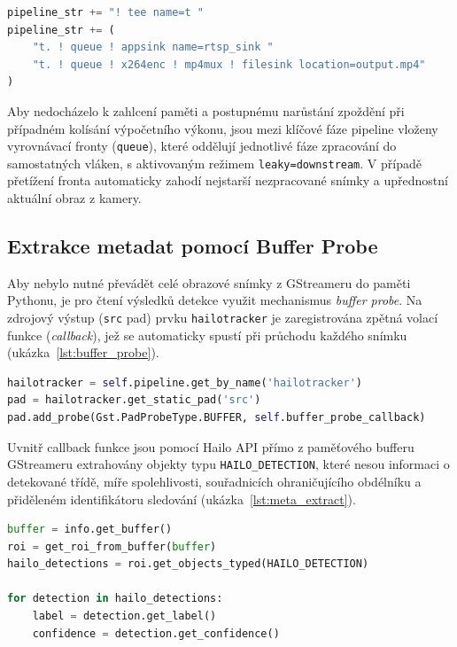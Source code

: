 \documentclass[male,czech,api_bc]{kitheses}
\begin{document}
\begin{lstlisting}[language=Python, caption={Větvení výstupu pipeline pomocí prvku tee.}, label={lst:gst_tee}]
pipeline_str += "! tee name=t "
pipeline_str += (
    "t. ! queue ! appsink name=rtsp_sink "
    "t. ! queue ! x264enc ! mp4mux ! filesink location=output.mp4"
)
\end{lstlisting}

Aby nedocházelo k zahlcení paměti a postupnému narůstání zpoždění při případném kolísání výpočetního výkonu, jsou mezi klíčové fáze pipeline vloženy vyrovnávací fronty (\texttt{queue}), které oddělují jednotlivé fáze zpracování do samostatných vláken, s aktivovaným režimem \texttt{leaky=downstream}. V případě přetížení fronta automaticky zahodí nejstarší nezpracované snímky a upřednostní aktuální obraz z kamery.

\subsection{Extrakce metadat pomocí Buffer Probe}
Aby nebylo nutné převádět celé obrazové snímky z GStreameru do paměti Pythonu, je pro čtení výsledků detekce využit mechanismus \textit{buffer probe}. Na zdrojový výstup (\texttt{src} pad) prvku \texttt{hailotracker} je zaregistrována zpětná volací funkce (\textit{callback}), jež se automaticky spustí při průchodu každého snímku (ukázka~\ref{lst:buffer_probe}).

\begin{lstlisting}[language=Python, caption={Registrace buffer probe na výstupu sledovacího modulu.}, label={lst:buffer_probe}]
hailotracker = self.pipeline.get_by_name('hailotracker')
pad = hailotracker.get_static_pad('src')
pad.add_probe(Gst.PadProbeType.BUFFER, self.buffer_probe_callback)
\end{lstlisting}

Uvnitř callback funkce jsou pomocí Hailo API přímo z paměťového bufferu GStreameru extrahovány objekty typu \texttt{HAILO\_DETECTION}, které nesou informaci o detekované třídě, míře spolehlivosti, souřadnicích ohraničujícího obdélníku a přiděleném identifikátoru sledování (ukázka~\ref{lst:meta_extract}).

\begin{lstlisting}[language=Python, caption={Extrakce detekčních metadat z GStreamer bufferu.}, label={lst:meta_extract}]
buffer = info.get_buffer()
roi = get_roi_from_buffer(buffer)
hailo_detections = roi.get_objects_typed(HAILO_DETECTION)

for detection in hailo_detections:
    label = detection.get_label()
    confidence = detection.get_confidence()
\end{lstlisting}
\end{document}
